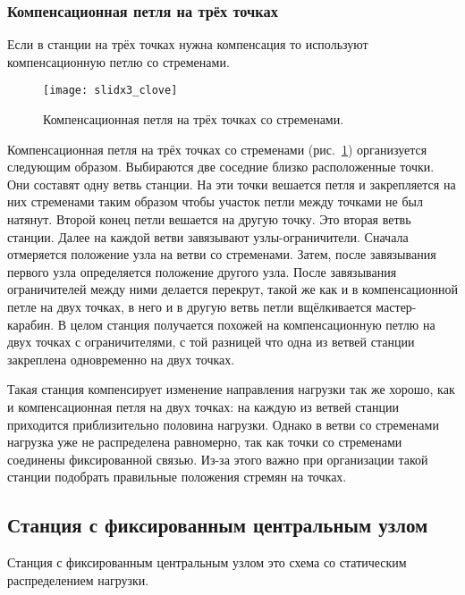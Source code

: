 \documentclass[fleqn, 12pt]{extarticle}
\begin{document}
    \subsubsection{Компенсационная петля на трёх точках}
    Если в станции на трёх точках нужна компенсация то используют компенсационную петлю со стременами.
    \begin{figure}[h]
        \centering
        \texttt{[image: slidx3\_clove]}
        \caption{Компенсационная петля на трёх точках со стременами.}\label{fig:slidx3_clove}
    \end{figure}
    Компенсационная петля на трёх точках со стременами (рис.~\ref{fig:slidx3_clove}) организуется следующим образом. Выбираются две соседние близко расположенные точки. Они составят
    одну ветвь станции. На эти точки вешается петля и закрепляется на них стременами таким образом чтобы участок петли между точками не был натянут. Второй конец петли вешается на другую точку.
    Это вторая ветвь станции. Далее на каждой ветви завязывают узлы-ограничители. Сначала отмеряется положение узла на ветви со стременами. Затем, после завязывания
    первого узла определяется положение другого узла. После завязывания ограничителей между ними делается перекрут, такой же как и в компенсационной петле на двух точках, в него и в другую
    ветвь петли вщёлкивается мастер-карабин. В целом станция получается похожей на компенсационную петлю на двух точках с ограничителями, с той разницей что одна из ветвей станции
    закреплена одновременно на двух точках.
    
    Такая станция компенсирует изменение направления нагрузки так же хорошо,
    как и компенсационная петля на двух точках: на каждую из ветвей станции приходится приблизительно половина нагрузки. Однако в ветви со стременами нагрузка уже не
    распределена равномерно, так как точки со стременами соединены фиксированной связью. Из-за этого важно при организации такой станции подобрать правильные
    положения стремян на точках.

\subsection{Станция с фиксированным центральным узлом}\label{sec:cordelette}
    Станция с фиксированным центральным узлом это схема со статическим распределением нагрузки.
\end{document}
